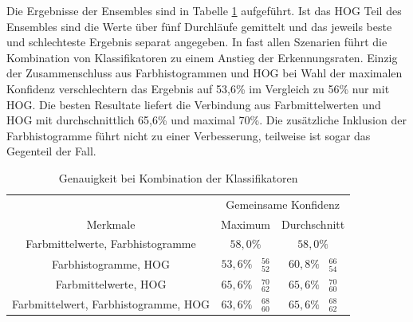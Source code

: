 \documentclass[11pt,a4paper]{article}
\begin{document}
Die Ergebnisse der Ensembles sind in Tabelle \ref{tab:classic_ensembles} aufgeführt. Ist das HOG Teil des Ensembles sind die Werte über fünf Durchläufe gemittelt und das jeweils beste und schlechteste Ergebnis separat angegeben. In fast allen Szenarien führt die Kombination von Klassifikatoren zu einem Anstieg der Erkennungsraten. Einzig der Zusammenschluss aus Farbhistogrammen und HOG bei Wahl der maximalen Konfidenz verschlechtern das Ergebnis auf 53,6\% im Vergleich zu 56\% nur mit HOG. Die besten Resultate liefert die Verbindung aus Farbmittelwerten und HOG mit durchschnittlich 65,6\% und maximal 70\%. Die zusätzliche Inklusion der Farbhistogramme führt nicht zu einer Verbesserung, teilweise ist sogar das Gegenteil der Fall.

\begin{table}[h]
	\begin{center}
		\begin{tabular}{c | c | c}
			& \multicolumn{2}{c}{Gemeinsame Konfidenz} \\ \cline{2-3}
			Merkmale & Maximum & Durchschnitt \\ \hline \hline
			Farbmittelwerte, Farbhistogramme & $58,0\%$ & $58,0\%$ \\ \hline
			Farbhistogramme, HOG & $53,6\%\hspace{10pt}_{52}^{56}$ & $60,8\%\hspace{10pt}_{54}^{66}$ \\ \hline
			Farbmittelwerte, HOG & $65,6\%\hspace{10pt}_{62}^{70}$ & $65,6\%\hspace{10pt}_{60}^{70}$ \\ \hline
			Farbmittelwert, Farbhistogramme, HOG & $63,6\%\hspace{10pt}_{60}^{68}$ & $65,6\%\hspace{10pt}_{62}^{68}$
		\end{tabular}
	\end{center}
\caption{Genauigkeit bei Kombination der Klassifikatoren}
\label{tab:classic_ensembles}
\end{table}
\end{document}
